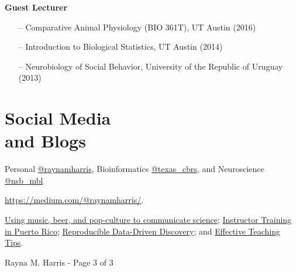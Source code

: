 \documentclass[margin,line]{CV}
\begin{document}
\begin{resume}
{\bf Guest Lecturer}
\begin{itemize}
\item[--] Comparative Animal Physiology (BIO 361T), UT Austin (2016)
\item[--] Introduction to Biological Statistics, UT Austin (2014)
\item[--] Neurobiology of Social Behavior, University of the Republic of Uruguay (2013)
\end{itemize}



\section{\mysidestyle Social Media\\and Blogs}

\begin{description}{}{
\setlength{\leftmargin}{1cm}%
\setlength{\itemindent}{-1cm}
}
\setlength{\itemsep}{3pt}
\item[Twitter:] Personal \href{http://twitter.com/raynamharris}{@raynamharris}, Bioinformatics \href{http://twitter.com/texas\_cbrs}{@texas\_cbrs}, and Neuroscience \href{http://twitter.com/nsb\_mbl}{@nsb\_mbl} 
\item[Professional/personal blog:] \url{https://medium.com/@raynamharris/}. \item[Selected blog posts:] 
\href{https://medium.com/@raynamharris/zombie-brains-microbial-mind-control-8f3c507255dc}{Using music, beer, and pop-culture to communicate science};
\href{https://medium.com/@raynamharris/instructor-training-in-puerto-rico-7c1ebc02e398}{Instructor Training in Puerto Rico};
\href{https://medium.com/@raynamharris/reproducible-data-driven-discovery-decbf1de2f46#.c63q0cget}{Reproducible Data-Driven Discovery}; and
\href{http://blogs.plos.org/neuro/2015/02/12/effective-teaching-tips-from-a-train-the-trainers-workshop/}{Effective Teaching Tips}.

\end{description}



\vspace{0.5 cm}
{\centerline {Rayna M. Harris - Page 3 of 3}}

\end{resume}
\end{document}
